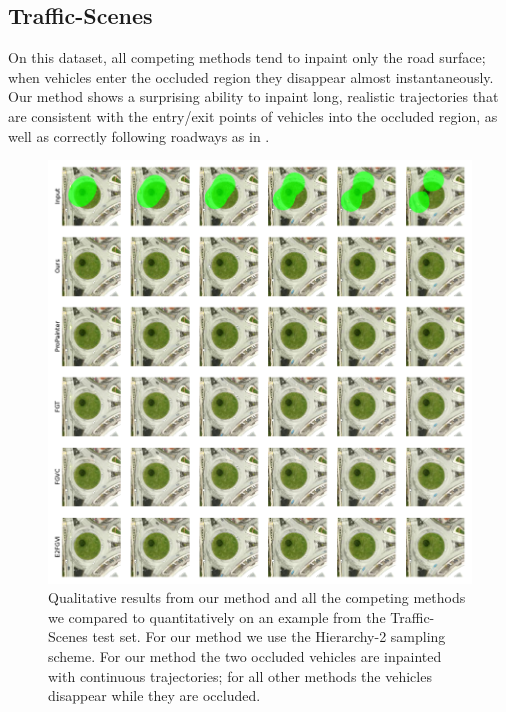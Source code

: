 \subsection{Traffic-Scenes} On this dataset, all competing methods tend to inpaint only the road surface; when vehicles enter the occluded region they disappear almost instantaneously. Our method shows a surprising ability to inpaint long, realistic trajectories that are consistent with the entry/exit points of vehicles into the occluded region, as well as correctly following roadways as in . %
\begin{figure}[t]
\begin{center}
    \centering
    \captionsetup{type=figure}
    \includegraphics[width=\linewidth]{figures/additional-samples/ts1.pdf}
    \caption[Qualitative results from our method and all competing methods on an example from the Traffic-Scenes test set.]{Qualitative results from our method and all the competing methods we compared to quantitatively on an example from the Traffic-Scenes test set. For our method we use the Hierarchy-2 sampling scheme. For our method the two occluded vehicles are inpainted with continuous trajectories; for all other methods the vehicles disappear while they are occluded.} 
    \label{fig:ts1}
\end{center}
\end{figure}
    
